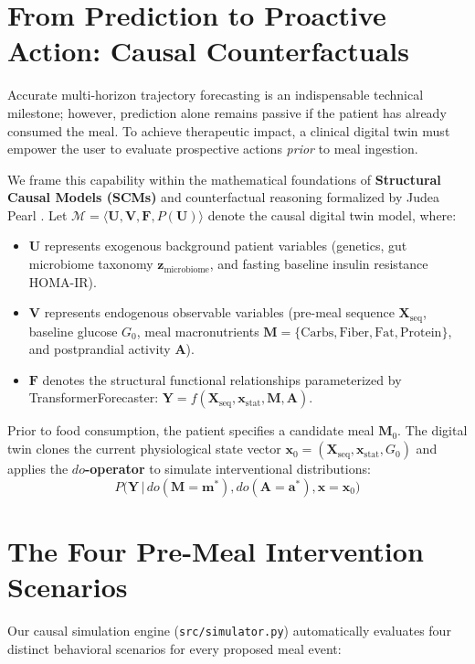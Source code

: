 \label{chap:causal_simulator_app}

\section{From Prediction to Proactive Action: Causal Counterfactuals}
Accurate multi-horizon trajectory forecasting is an indispensable technical milestone; however, prediction alone remains passive if the patient has already consumed the meal. To achieve therapeutic impact, a clinical digital twin must empower the user to evaluate prospective actions \emph{prior} to meal ingestion.

We frame this capability within the mathematical foundations of \textbf{Structural Causal Models (SCMs)} and counterfactual reasoning formalized by Judea Pearl \cite{pearl2009causality}. Let $\mathcal{M} = \langle \mathbf{U}, \mathbf{V}, \mathbf{F}, P(\mathbf{U}) \rangle$ denote the causal digital twin model, where:
\begin{itemize}
    \item $\mathbf{U}$ represents exogenous background patient variables (genetics, gut microbiome taxonomy $\mathbf{z}_{\text{microbiome}}$, and fasting baseline insulin resistance HOMA-IR).
    \item $\mathbf{V}$ represents endogenous observable variables (pre-meal sequence $\mathbf{X}_{\text{seq}}$, baseline glucose $G_0$, meal macronutrients $\mathbf{M} = \{\text{Carbs}, \text{Fiber}, \text{Fat}, \text{Protein}\}$, and postprandial activity $\mathbf{A}$).
    \item $\mathbf{F}$ denotes the structural functional relationships parameterized by TransformerForecaster: $\mathbf{Y} = f(\mathbf{X}_{\text{seq}}, \mathbf{x}_{\text{stat}}, \mathbf{M}, \mathbf{A})$.
\end{itemize}

Prior to food consumption, the patient specifies a candidate meal $\mathbf{M}_0$. The digital twin clones the current physiological state vector $\mathbf{x}_0 = (\mathbf{X}_{\text{seq}}, \mathbf{x}_{\text{stat}}, G_0)$ and applies the \textbf{$do$-operator} \cite{pearl2009causality} to simulate interventional distributions:
\begin{equation}
    P\Big(\mathbf{Y} \,\Big|\, do(\mathbf{M} = \mathbf{m}^*), do(\mathbf{A} = \mathbf{a}^*), \mathbf{x} = \mathbf{x}_0\Big)
\end{equation}

\section{The Four Pre-Meal Intervention Scenarios}
Our causal simulation engine (\texttt{src/simulator.py}) automatically evaluates four distinct behavioral scenarios for every proposed meal event:

